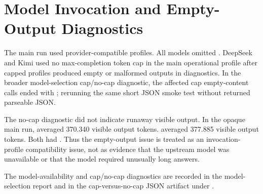\section{Model Invocation and Empty-Output Diagnostics}
\label{app:model-invocation}

The main run used provider-compatible profiles. All models omitted . DeepSeek and Kimi used no max-completion token cap in the main operational profile after capped profiles produced empty or malformed outputs in diagnostics. In the broader model-selection cap/no-cap diagnostic, the affected  cap empty-content calls ended with ; rerunning the same short JSON smoke test without  returned parseable JSON.

The no-cap diagnostic did not indicate runaway visible output. In the opaque main run,  averaged 370.340 visible output tokens.  averaged 377.885 visible output tokens. Both had . Thus the empty-output issue is treated as an invocation-profile compatibility issue, not as evidence that the upstream model was unavailable or that the model required unusually long answers.

The model-availability and cap/no-cap diagnostics are recorded in the model-selection report and in the cap-versus-no-cap JSON artifact under .

